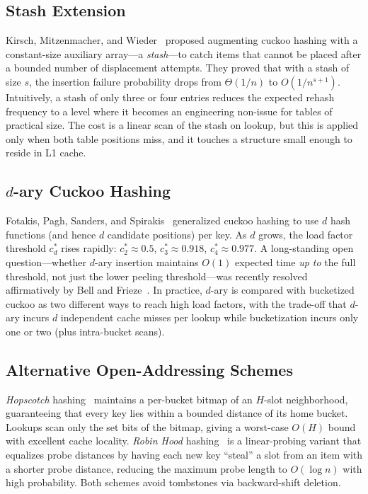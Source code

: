 \documentclass[10pt,journal,compsoc]{IEEEtran}
\begin{document}
\subsection{Stash Extension}
Kirsch, Mitzenmacher, and Wieder~\cite{kirsch2009stash} proposed augmenting cuckoo hashing with a constant-size auxiliary array---a \emph{stash}---to catch items that cannot be placed after a bounded number of displacement attempts. They proved that with a stash of size $s$, the insertion failure probability drops from $\Theta(1/n)$ to $O(1/n^{s+1})$. Intuitively, a stash of only three or four entries reduces the expected rehash frequency to a level where it becomes an engineering non-issue for tables of practical size. The cost is a linear scan of the stash on lookup, but this is applied only when both table positions miss, and it touches a structure small enough to reside in L1 cache.

\subsection{$d$-ary Cuckoo Hashing}
Fotakis, Pagh, Sanders, and Spirakis~\cite{fotakis2005dary} generalized cuckoo hashing to use $d$ hash functions (and hence $d$ candidate positions) per key. As $d$ grows, the load factor threshold $c_d^*$ rises rapidly: $c_2^* \approx 0.5$, $c_3^* \approx 0.918$, $c_4^* \approx 0.977$. A long-standing open question---whether $d$-ary insertion maintains $O(1)$ expected time \emph{up to} the full threshold, not just the lower peeling threshold---was recently resolved affirmatively by Bell and Frieze~\cite{bell2024dary}. In practice, $d$-ary is compared with bucketized cuckoo as two different ways to reach high load factors, with the trade-off that $d$-ary incurs $d$ independent cache misses per lookup while bucketization incurs only one or two (plus intra-bucket scans).

\subsection{Alternative Open-Addressing Schemes}
\emph{Hopscotch} hashing~\cite{herlihy2008hopscotch} maintains a per-bucket bitmap of an $H$-slot neighborhood, guaranteeing that every key lies within a bounded distance of its home bucket. Lookups scan only the set bits of the bitmap, giving a worst-case $O(H)$ bound with excellent cache locality. \emph{Robin Hood} hashing~\cite{celis1985robinhood} is a linear-probing variant that equalizes probe distances by having each new key ``steal'' a slot from an item with a shorter probe distance, reducing the maximum probe length to $O(\log n)$ with high probability. Both schemes avoid tombstones via backward-shift deletion.
\end{document}
